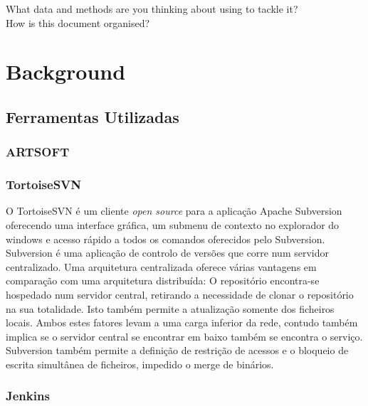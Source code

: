 \documentclass[sigplan]{acmart}
\begin{document}
What data and methods are you thinking about using to tackle it? \\ %

How is this document organised? \\

\section{Background} \label{sec:background}

\subsection{Ferramentas Utilizadas}

\subsubsection{ARTSOFT}



\subsubsection{TortoiseSVN}

O TortoiseSVN é um cliente \textit{open source} para a aplicação Apache Subversion oferecendo uma interface gráfica, um submenu de contexto no explorador do windows e acesso rápido a todos os comandos oferecidos pelo Subversion. Subversion é uma aplicação de controlo de versões que corre num servidor centralizado. Uma arquitetura centralizada oferece várias vantagens em comparação com uma arquitetura distribuída: O repositório encontra-se hospedado num servidor central, retirando a necessidade de clonar o repositório na sua totalidade. Isto também permite a atualização somente dos ficheiros locais. Ambos estes fatores levam a uma carga inferior da rede, contudo também implica se o servidor central se encontrar em baixo também se encontra o serviço. Subversion também permite a definição de restrição de acessos e o bloqueio de escrita simultânea de ficheiros, impedido o merge de binários.

\subsubsection{Jenkins}
\end{document}
